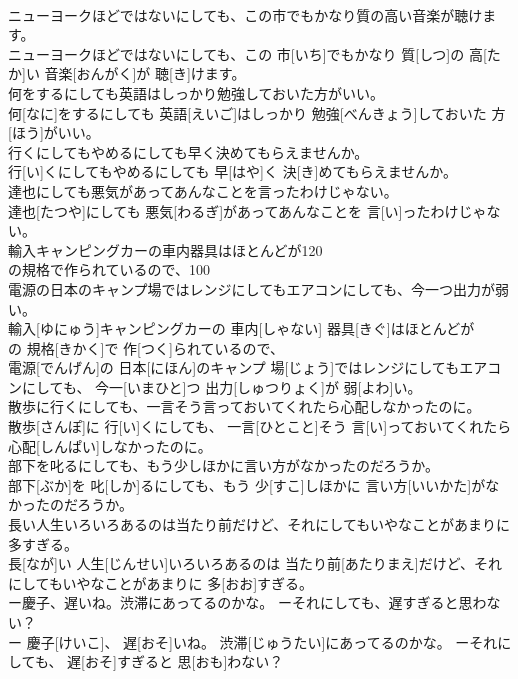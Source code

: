 \documentclass[8pt]{extreport}
\begin{document}
\begin{CJK}{UTF8}{min}
\\	ニューヨークほどではないにしても、この市でもかなり質の高い音楽が聴けます。	
\\	ニューヨークほどではないにしても、この 市[いち]でもかなり 質[しつ]の 高[たか]い 音楽[おんがく]が 聴[き]けます。
\\	何をするにしても英語はしっかり勉強しておいた方がいい。	
\\	何[なに]をするにしても 英語[えいご]はしっかり 勉強[べんきょう]しておいた 方[ほう]がいい。
\\	行くにしてもやめるにしても早く決めてもらえませんか。	
\\	行[い]くにしてもやめるにしても 早[はや]く 決[き]めてもらえませんか。
\\	達也にしても悪気があってあんなことを言ったわけじゃない。	
\\	達也[たつや]にしても 悪気[わるぎ]があってあんなことを 言[い]ったわけじゃない。
\\	輸入キャンピングカーの車内器具はほとんどが120
\\	の規格で作られているので、100
\\	電源の日本のキャンプ場ではレンジにしてもエアコンにしても、今一つ出力が弱い。	
\\	輸入[ゆにゅう]キャンピングカーの 車内[しゃない] 器具[きぐ]はほとんどが 
\\	の 規格[きかく]で 作[つく]られているので、 
\\	電源[でんげん]の 日本[にほん]のキャンプ 場[じょう]ではレンジにしてもエアコンにしても、 今一[いまひと]つ 出力[しゅつりょく]が 弱[よわ]い。
\\	散歩に行くにしても、一言そう言っておいてくれたら心配しなかったのに。	
\\	散歩[さんぽ]に 行[い]くにしても、 一言[ひとこと]そう 言[い]っておいてくれたら 心配[しんぱい]しなかったのに。
\\	部下を叱るにしても、もう少しほかに言い方がなかったのだろうか。	
\\	部下[ぶか]を 叱[しか]るにしても、もう 少[すこ]しほかに 言い方[いいかた]がなかったのだろうか。
\\	長い人生いろいろあるのは当たり前だけど、それにしてもいやなことがあまりに多すぎる。	
\\	長[なが]い 人生[じんせい]いろいろあるのは 当たり前[あたりまえ]だけど、それにしてもいやなことがあまりに 多[おお]すぎる。
\\	ー慶子、遅いね。渋滞にあってるのかな。 ーそれにしても、遅すぎると思わない？	
\\	ー 慶子[けいこ]、 遅[おそ]いね。 渋滞[じゅうたい]にあってるのかな。 ーそれにしても、 遅[おそ]すぎると 思[おも]わない？

\end{CJK}
\end{document}
